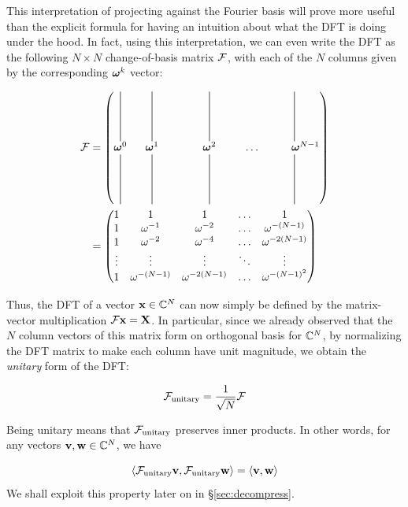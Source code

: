 This interpretation of projecting against the Fourier basis will prove more useful than the explicit formula for having an intuition about what the DFT is doing under the hood.
In fact, using this interpretation, we can even write the DFT as the following $N \times N$ change-of-basis matrix $\mathcal{F}$, with each of the $N$ columns given by the corresponding $\boldsymbol{\omega}^k$ vector:

\begin{align}
	\fancyF &= \begin{pmatrix}
    		\vertbar & \ \  \vertbar & \ \ \ \ \ \ \ \ \  \vertbar & & \vertbar \\
    		\boldomega^0  & \ \   \boldomega^1  & \ \ \ \ \ \ \ \ \  \boldomega^2 & \ \ \ \ \ \dots & \ \ \ \ \ \ \boldomega^{N-1} \\
 		\vertbar & \ \  \vertbar & \ \ \ \ \ \ \ \ \  \vertbar & & \vertbar 
  	\end{pmatrix} \\	
	&= \begin{pmatrix}
	1 & 1 & 1 & \dots & 1 \\
	1 & \omega^{-1} & \omega^{-2} & \dots & \omega^{-(N-1)} \\
	1 & \omega^{-2} & \omega^{-4} & \dots & \omega^{-2(N-1)} \\
	\vdots & \vdots & \vdots & \ddots & \vdots \\
	1 & \omega^{-(N-1)} & \omega^{-2(N-1)} & \dots & \omega^{-{(N-1)}^2}
	\end{pmatrix}	
\end{align}

Thus, the DFT of a vector $\mathbf{x} \in \mathbb{C}^N$ can now simply be defined by the matrix-vector multiplication $\mathcal{F} \mathbf{x} = \mathbf{X}$. In particular, since we already observed that the $N$ column vectors of this matrix form on orthogonal basis for $\mathbb{C}^N$, by normalizing the DFT matrix to make each column have unit magnitude, we obtain the {\em unitary} form of the DFT:

\begin{equation}
	\mathcal{F}_{\textrm{unitary}} = \frac{1}{\sqrt{N}} \mathcal{F}
\end{equation}

Being unitary means that $\mathcal{F}_{\textrm{unitary}}$ preserves inner products. In other words, for any vectors $\mathbf{v}, \mathbf{w} \in \mathbb{C}^N$, we have

\begin{equation}
	\langle \mathcal{F}_{\textrm{unitary}}\mathbf{v}, \mathcal{F}_{\textrm{unitary}}\mathbf{w} \rangle = \langle \mathbf{v}, \mathbf{w} \rangle
\end{equation}
We shall exploit this property later on in \S\ref{sec:decompress}.

